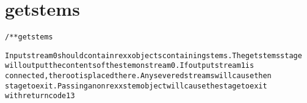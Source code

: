 \section{getstems}
\begin{shaded}
\begin{alltt}
/** getstems

Input stream 0 should contain rexx objects containing stems.  The getstems stage
will output the contents of the stem on stream 0.  If output stream 1 is
connected, the root is placed there.  Any severed streams will cause then
stage to exit.  Passing a non rexx stem object will cause the stage to exit
with return code 13

\end{alltt}
\end{shaded}
